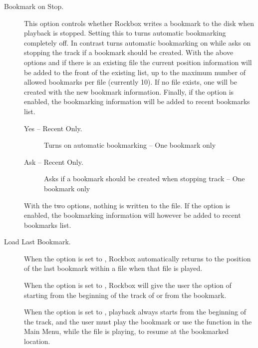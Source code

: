   \begin{description}
  \item [Bookmark on Stop.] This option controls whether Rockbox writes a
    bookmark to the disk when playback is stopped. Setting this to
     turns automatic bookmarking completely off. In contrast
     turns automatic bookmarking on while  
    asks on stopping the track if a bookmark should be created.
    With the above options  and  if there is an existing 
     file the current position information will be added to the
    front of the existing list, up to the maximum number of allowed bookmarks
    per file (currently 10). If no  file exists, one will be
    created with the new bookmark information. Finally, if the 
     option is enabled, the bookmarking
    information will be added to recent bookmarks list.
    \begin{description}    
      \item[Yes -- Recent Only.]
            Turns on automatic bookmarking -- One bookmark only
      \item[Ask -- Recent Only.]
            Asks if a bookmark should be created when stopping track -- 
            One bookmark only
    \end{description}
    With the two  options, nothing is written to the 
     file. If the 
    option is enabled, the bookmarking information will however be added to
    recent bookmarks list. 
    
  \item [Load Last Bookmark.]

  When the  option is set to , Rockbox
  automatically returns to the position of the last bookmark within a file
  when that file is played. 

  When the  option is set to , Rockbox will
  give the user the option of starting from the beginning of the track
  of or from the bookmark. 

  When the  option is set to , playback always
  starts from the beginning of the track, and the user must play the bookmark
  or use the  function in the Main Menu, while the file
  is playing, to resume at the bookmarked location.
    

\end{description}
